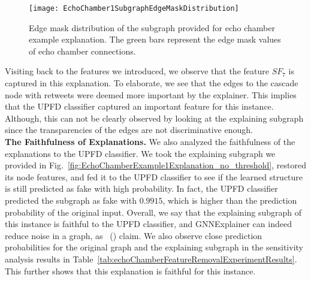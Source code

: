 \begin{figure}
    \centering
    \texttt{[image: EchoChamber1SubgraphEdgeMaskDistribution]}
    \caption[Edge mask distribution of the subgraph provided for echo chamber example explanation.]{Edge mask distribution of the subgraph provided for echo chamber example explanation. The green bars represent the edge mask values of echo chamber connections.}
    \label{fig:EchoChamber1SubgraphEdgeMaskDistribution}
\end{figure}
Visiting back to the features we introduced, we observe that the feature $SF_7$ is captured in this explanation. To elaborate, we see that the edges to the cascade node with retweets were deemed more important by the explainer. This implies that the UPFD classifier captured an important feature for this instance. Although, this can not be clearly observed by looking at the explaining subgraph since the transparencies of the edges are not discriminative enough.\\
\textbf{The Faithfulness of Explanations.} We also analyzed the faithfulness of the explanations to the UPFD classifier. We took the explaining subgraph we provided in Fig.~\ref{fig:EchoChamberExample1Explanation_no_threshold}, restored its node features, and fed it to the UPFD classifier to see if the learned structure is still predicted as fake with high probability. In fact, the UPFD classifier predicted the subgraph as fake with $0.9915$, which is higher than the prediction probability of the original input. Overall, we say that the explaining subgraph of this instance is faithful to the UPFD classifier, and GNNExplainer can indeed reduce noise in a graph, as~\citeauthor{GNNExplainer_Ying} (\citeyear{GNNExplainer_Ying}) claim. We also observe close prediction probabilities for the original graph and the explaining subgraph in the sensitivity analysis results in Table~\ref{tab:echoChamberFeatureRemovalExperimentResults}. This further shows that this explanation is faithful for this instance.\\
